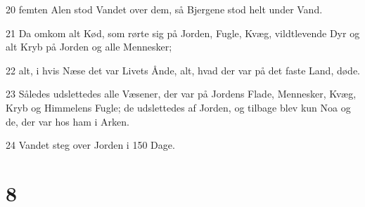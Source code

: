 \par 20 femten Alen stod Vandet over dem, så Bjergene stod helt under Vand.
\par 21 Da omkom alt Kød, som rørte sig på Jorden, Fugle, Kvæg, vildtlevende Dyr og alt Kryb på Jorden og alle Mennesker;
\par 22 alt, i hvis Næse det var Livets Ånde, alt, hvad der var på det faste Land, døde.
\par 23 Således udslettedes alle Væsener, der var på Jordens Flade, Mennesker, Kvæg, Kryb og Himmelens Fugle; de udslettedes af Jorden, og tilbage blev kun Noa og de, der var hos ham i Arken.
\par 24 Vandet steg over Jorden i 150 Dage.

\chapter{8}

